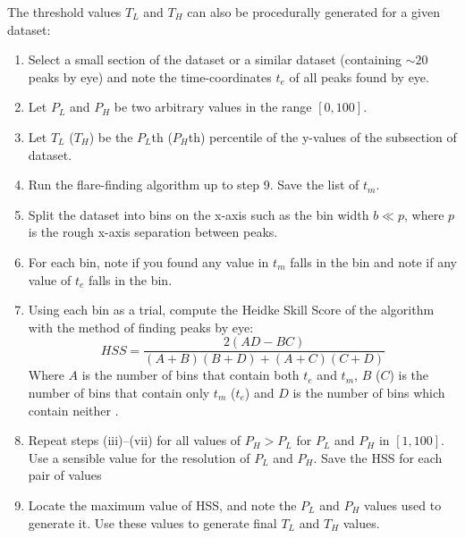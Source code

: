 \par The threshold values $T_L$ and $T_H$ can also be procedurally generated for a given dataset:

\begin{enumerate}
  \item Select a small section of the dataset or a similar dataset (containing $\sim20$ peaks by eye) and note the time-coordinates $t_e$ of all peaks found by eye.
  \item Let $P_L$ and $P_H$ be two arbitrary values in the range $[0,100]$.
  \item Let $T_L$ ($T_H$) be the $P_L$th ($P_H$th) percentile of the y-values of the subsection of dataset.
  \item Run the flare-finding algorithm up to step 9.  Save the list of $t_m$.
  \item Split the dataset into bins on the x-axis such as the bin width $b\ll p$, where $p$ is the rough x-axis separation between peaks.
  \item For each bin, note if you found any value in $t_m$ falls in the bin and note if any value of $t_e$ falls in the bin.
  \item Using each bin as a trial, compute the Heidke Skill Score \citep{Heidke_SKSC} of the algorithm with the method of finding peaks by eye:
  \begin{equation}HSS = \frac{2(AD-BC)}{(A+B)(B+D)+(A+C)(C+D)}
  \label{eq:HSS}
  \end{equation}
  Where $A$ is the number of bins that contain both $t_e$ and $t_m$, $B$ ($C$) is the number of bins that contain only $t_m$ ($t_e$) and $D$ is the number of bins which contain neither \citep{Kok_YesNo}.
  \item Repeat steps (iii)--(vii) for all values of $P_H>P_L$ for $P_L$ and $P_H$ in $[1,100]$.  Use a sensible value for the resolution of $P_L$ and $P_H$.  Save the HSS for each pair of values
  \item Locate the maximum value of HSS, and note the $P_L$ and $P_H$ values used to generate it.  Use these values to generate final $T_L$ and $T_H$ values.
\end{enumerate}



